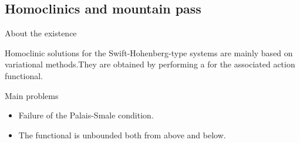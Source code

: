 \documentclass[9pt, english]{beamer}
\theoremstyle{definition}
\begin{document}
\subsection{Homoclinics and mountain pass}
\begin{frame}{About the existence}
    \begin{block}{Homoclinic solutions}
        for the Swift-Hohenberg-type systems are mainly based on  variational
        methods.\pause They are obtained by performing a
         for the associated action functional.
    \end{block}
    \pause
    \begin{block}{Main problems}\pause
        \begin{itemize}
        \item \alert{Failure of the Palais-Smale condition}.\pause
        \item \alert{The functional is unbounded both from above and below.}
        \end{itemize}
    \end{block}
\end{frame}
\end{document}
